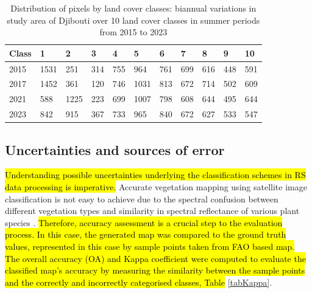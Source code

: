 \documentclass[jimaging,article,submit,pdftex,moreauthors]{Definitions/mdpi}
\begin{document}
\begin{table}[H]
\centering
\begin{tabularx}{\textwidth}{| p{1.5cm} | X | X | X | X | X | X | X | X | X | X | }
  \toprule
   Class & 1 & 2 & 3 & 4 & 5 & 6 & 7 & 8 & 9 & 10 \\
   \midrule
    2015 & 1531 & 251 & 314 & 755 & 964 & 761 & 699 & 616 & 448 & 591 \\
    2017 & 1452 & 361 & 120 & 746 & 1031 & 813 & 672 & 714 & 502 & 609 \\
    2021 & 588 & 1225 & 223 & 699 & 1007 & 798 & 608 & 644 & 495 & 644 \\
    2023 & 842 & 915 & 367 & 733 & 965 & 840 & 672 & 627 & 533 & 547 \\
    \bottomrule
\end{tabularx}
\caption{Distribution of pixels by land cover classes: biannual variations in study area of Djibouti over 10 land cover classes in summer periods from 2015 to 2023}\label{tab04}
\end{table}

\subsection{Uncertainties and sources of error}

\hl{Understanding possible uncertainties underlying the classification schemes in RS data processing is imperative. }Accurate vegetation mapping using satellite image classification is not easy to achieve due to the spectral confusion between different vegetation types and\hl{ }similarity in spectral reflectance of various plant species \cite{1370179,Dobrowski,Moore,8688643}. \hl{Therefore, accuracy assessment is a crucial step to the evaluation process. In this case, the generated map was compared to the ground truth values, represented in this case by sample points taken from FAO based map. The overall accuracy (OA) and Kappa coefficient were computed to evaluate the classified map's accuracy by measuring the similarity between the sample points and the correctly and incorrectly categorised classes, Table} \ref{tabKappa}. 
\end{document}
